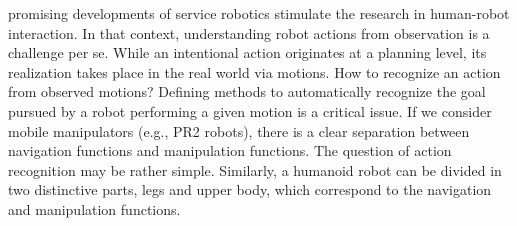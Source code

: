 \documentclass[journal]{IEEEtran}
\begin{document}
 promising developments of service robotics stimulate the
research in human-robot interaction. In that context, understanding
robot actions from observation is a challenge per se. While an
intentional action originates at a planning level, its realization takes
place in the real world via motions. How to recognize an action from
observed motions? Defining methods to automatically recognize the goal
pursued by a robot performing a given motion is a critical issue. If we
consider mobile manipulators (e.g., PR2 robots),
there is a clear separation between navigation functions and
manipulation functions. The question of action recognition may be rather
simple. Similarly, a humanoid robot can be divided in two distinctive parts,
legs and upper body, which correspond to the navigation and manipulation
functions.
\end{document}
